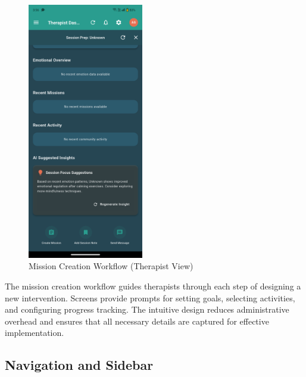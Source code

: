 ﻿\documentclass[12pt,a4paper]{article}
\newcommand{\sectiontitle}[1]{\subsection{#1}}
\begin{document}
\begin{figure}[H]
    \centering
    \includegraphics[width=0.45\textwidth]{Screenshots/restofmissioncreationtherapist.png}
    \caption{Mission Creation Workflow (Therapist View)}
    \label{fig:mission-creation-workflow}
\end{figure}
The mission creation workflow guides therapists through each step of designing a new intervention. Screens provide prompts for setting goals, selecting activities, and configuring progress tracking. The intuitive design reduces administrative overhead and ensures that all necessary details are captured for effective implementation.

\sectiontitle{Navigation and Sidebar}
\end{document}
